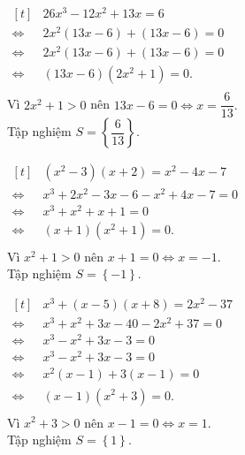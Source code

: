 {\begin{vd}
\begin{listEX}[2]
	\end{listEX}
	\loigiai
	{ \allowdisplaybreaks
				\begin{listEX}[2]
			\item $\begin{aligned}[t]
		&	26x^3 - 12x^2 + 13x = 6\\
			\Leftrightarrow\ &2x^2(13x - 6) + (13x - 6) = 0\\
			\Leftrightarrow\ &2x^2(13x - 6) + (13x - 6) = 0\\
			\Leftrightarrow\ &(13x - 6)(2x^2 + 1) = 0.\\
		\end{aligned}$\\
			Vì $2x^2 + 1 > 0$ nên $13x - 6 = 0 \Leftrightarrow x = \dfrac{6}{13}.$\\
			Tập nghiệm $S = \left\{\dfrac{6}{13}  \right\} .$
			\item $\begin{aligned}[t]
			&(x^2 - 3)(x + 2) = x^2 - 4x - 7\\
			\Leftrightarrow \ & x^3 + 2x^2 - 3x - 6 - x^2 + 4x - 7 = 0\\
			\Leftrightarrow \ & x^3 + x^2 + x + 1 = 0\\
			\Leftrightarrow\  &(x +  1)(x^2 + 1) = 0.\\
			\end{aligned}$\\
			Vì $x^2 + 1 > 0$ nên $x + 1 = 0 \Leftrightarrow x = - 1.$	\\
			Tập nghiệm $S = \left\{- 1\right\}.$
			\item 	$\begin{aligned}[t]
			&x^3 + (x - 5)(x + 8) = 2x^2 - 37 \\
			\Leftrightarrow\ & x^3 + x^2 + 3x - 40- 2x^2 + 37 = 0\\
			\Leftrightarrow\ & x^3 - x^2 + 3x - 3 = 0\\
			\Leftrightarrow\ & x^3 - x^2 + 3x - 3 = 0\\
			\Leftrightarrow\ & x^2(x - 1) + 3(x - 1) = 0\\
			\Leftrightarrow\ & (x - 1)(x^2 + 3) = 0.\\
		\end{aligned}$\\
			Vì $x^2 + 3 > 0$ nên $x - 1 = 0 \Leftrightarrow x = 1.$\\
			Tập nghiệm $S = \left\{1\right\}.$
			
		\end{listEX}
	}
\end{vd}


}
